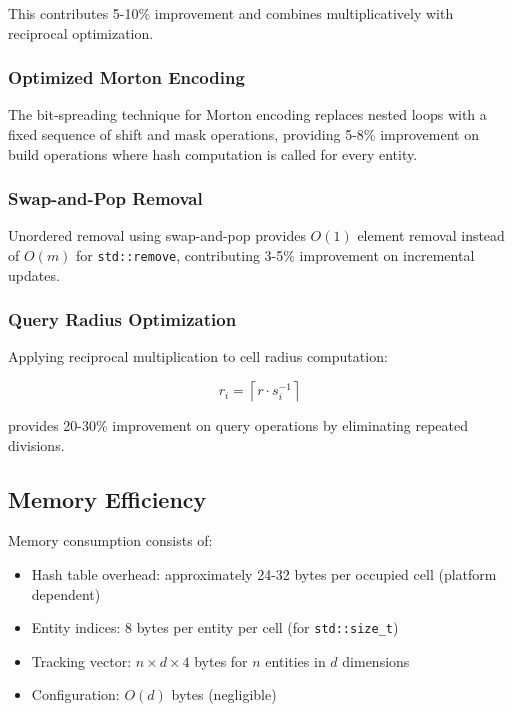 \documentclass[11pt]{article}
\begin{document}
This contributes 5-10\% improvement and combines multiplicatively with reciprocal optimization.

\subsubsection{Optimized Morton Encoding}

The bit-spreading technique for Morton encoding replaces nested loops with a fixed sequence of shift and mask operations, providing 5-8\% improvement on build operations where hash computation is called for every entity.

\subsubsection{Swap-and-Pop Removal}

Unordered removal using swap-and-pop provides $O(1)$ element removal instead of $O(m)$ for \texttt{std::remove}, contributing 3-5\% improvement on incremental updates.

\subsubsection{Query Radius Optimization}

Applying reciprocal multiplication to cell radius computation:

\begin{equation}
r_i = \left\lceil r \cdot s_i^{-1} \right\rceil
\end{equation}

provides 20-30\% improvement on query operations by eliminating repeated divisions.

\subsection{Memory Efficiency}

Memory consumption consists of:

\begin{itemize}
\item Hash table overhead: approximately 24-32 bytes per occupied cell (platform dependent)
\item Entity indices: 8 bytes per entity per cell (for \texttt{std::size\_t})
\item Tracking vector: $n \times d \times 4$ bytes for $n$ entities in $d$ dimensions
\item Configuration: $O(d)$ bytes (negligible)
\end{itemize}
\end{document}
